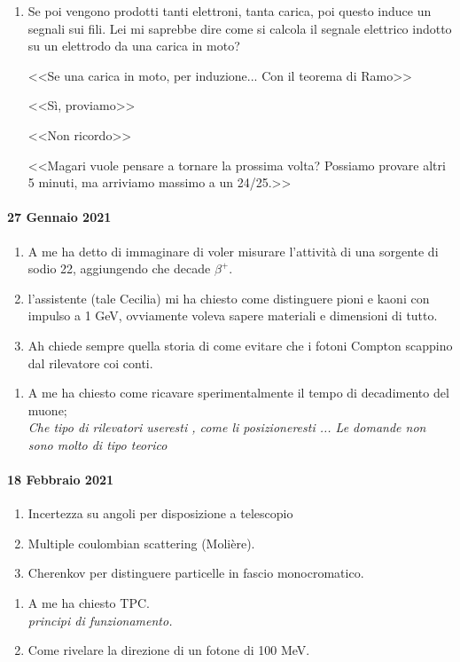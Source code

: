 \documentclass[../main.tex]{subfiles}
\begin{document}
\begin{enumerate}
{    }
    \item Se poi vengono prodotti tanti elettroni, tanta carica, poi questo induce un segnali sui fili. Lei mi saprebbe dire come si calcola il segnale elettrico indotto su un elettrodo da una carica in moto?
    \begin{flushright}
    <<Se una carica in moto, per induzione... Con il teorema di Ramo>>
    \end{flushright}
    <<Sì, proviamo>>
    \begin{flushright}
    <<Non ricordo>>
    \end{flushright}
    <<Magari vuole pensare a tornare la prossima volta? Possiamo provare altri 5 minuti, ma arriviamo massimo a un 24/25.>>
    \end{enumerate}
\paragraph{27 Gennaio 2021}
    \begin{enumerate}
        \item A me ha detto di immaginare di voler misurare l'attività di una sorgente di sodio 22, aggiungendo che decade $\beta^+$.
        \item l'assistente (tale Cecilia) mi ha chiesto come distinguere pioni e kaoni con impulso a 1 GeV, ovviamente voleva sapere materiali e dimensioni di tutto.
        \item Ah chiede sempre quella storia di come evitare che i fotoni Compton scappino dal rilevatore coi conti.
    \end{enumerate}
    \begin{enumerate}
        \item A me ha chiesto come ricavare sperimentalmente il tempo di decadimento del muone;\\
        \textit{Che tipo di rilevatori useresti , come li posizioneresti ... Le domande non sono molto di tipo teorico}
    \end{enumerate}
\paragraph{18 Febbraio 2021}
    \begin{enumerate}
        \item Incertezza su angoli per disposizione a telescopio \item Multiple coulombian scattering (Molière).
        \item Cherenkov per distinguere particelle in fascio monocromatico.
    \end{enumerate}
    \begin{enumerate}
        \item A me ha chiesto TPC.\\
        \textit{principi di funzionamento.}
        \item Come rivelare la direzione di un fotone di 100 MeV.
    \end{enumerate}
\end{document}
